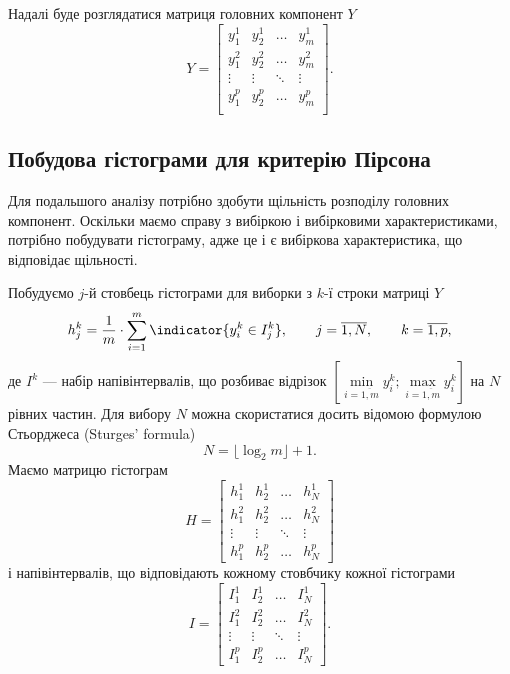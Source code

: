 Надалі буде розглядатися матриця головних компонент $Y$
\begin{equation*}
  Y = \begin{bmatrix}
    y_1^1  & y_2^1  & \dots  & y_m^1  \\
    y_1^2  & y_2^2  & \dots  & y_m^2  \\
    \vdots & \vdots & \ddots & \vdots \\
    y_1^p  & y_2^p  & \dots  & y_m^p  \\
    \end{bmatrix}.
\end{equation*}
\subsection{Побудова гістограми для критерію Пірсона}

Для подальшого аналізу потрібно здобути щільність розподілу головних компонент.
Оскільки маємо справу з вибіркою і вибірковими характеристиками,
потрібно побудувати гістограму, адже це і є вибіркова характеристика,
що відповідає щільності.

Побудуємо $j$-й стовбець гістограми для виборки з $k$-ї строки матриці $Y$
\begin{equation*}
  h_j^k = \frac{1}{m} \cdot \sum_{i=1}^{m} \indicator{y_i^k \in I_j^k},
  \qquad j = \overline{1, N},
  \qquad k = \overline{1, p},
\end{equation*}
де $I^k$ --- набір напівінтервалів, що розбиває відрізок
$\left[ \min\limits_{i=\overline{1,m}}{y_i^k};
\max\limits_{i=\overline{1,m}}{y_i^k} \right]$ на $N$ рівних частин.
Для вибору $N$ можна скористатися досить відомою формулою Стьорджеса
(Sturges' formula) \cite{Sturges:1926:CCI}
\begin{equation*}
  N = \lfloor \log_2 m \rfloor + 1.
\end{equation*}
Маємо матрицю гістограм
\begin{equation*}
  H = \begin{bmatrix}
    h_1^1  & h_2^1  & \dots  & h_N^1  \\
    h_1^2  & h_2^2  & \dots  & h_N^2  \\
    \vdots & \vdots & \ddots & \vdots \\
    h_1^p  & h_2^p  & \dots  & h_N^p
  \end{bmatrix}
\end{equation*}
і напівінтервалів, що відповідають кожному стовбчику кожної гістограми
\begin{equation*}
  I = \begin{bmatrix}
    I_1^1  & I_2^1  & \dots  & I_N^1  \\
    I_1^2  & I_2^2  & \dots  & I_N^2  \\
    \vdots & \vdots & \ddots & \vdots \\
    I_1^p  & I_2^p  & \dots  & I_N^p
  \end{bmatrix}.
\end{equation*}

